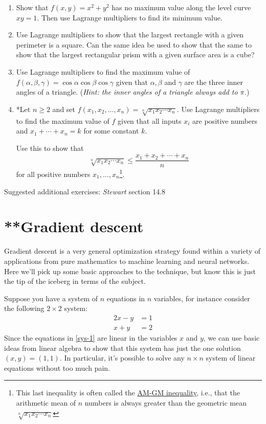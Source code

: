 \documentclass[12pt]{article}
\numberwithin{equation}{subsection}
\numberwithin{figure}{subsection}
\theoremstyle{note}
\begin{document}
{\begin{enumerate}[label=\arabic*.]
\item Show that $f(x,y)=x^2+y^2$ has no maximum value along the level curve $xy=1$. Then use Lagrange multipliers to find its minimum value.

\item Use Lagrange multipliers to show that the largest rectangle with a given perimeter is a square. Can the same idea be used to show that the same to show that the largest rectangular prism with a given surface area is a cube?

\item Use Lagrange multipliers to find the maximum value of $f(\alpha, \beta,\gamma)=\cos \alpha \cos\beta \cos\gamma$ given that $\alpha, \beta$ and $\gamma$ are the three inner angles of a triangle. (\textit{Hint: the inner angles of a triangle always add to $\pi$.})

\item *Let $n\geq 2$ and set $f(x_1,x_2,\dots, x_n)=\sqrt[n]{x_1x_2\cdots x_n}$. Use Lagrange multipliers to find the maximum value of $f$ given that all inputs $x_i$ are positive numbers and $x_1+\cdots+x_n=k$ for some constant $k$. 

Use this to show that \[ \sqrt[n]{x_1x_2\cdots x_n} \leq \dfrac{x_1+x_2+\cdots+x_n}{n} \] for all positive numbers $x_1,\dots, x_n$\footnote{This last inequality is often called the \href{https://en.wikipedia.org/wiki/AM\%E2\%80\%93GM_inequality}{AM-GM inequality}, i.e., that the arithmetic mean of $n$ numbers is always greater than the geometric mean $\sqrt[n]{x_1x_2\cdots x_n}$}.

\end{enumerate}
Suggested additional exercises: \textit{Stewart} section 14.8


\section{**Gradient descent}

Gradient descent is a very general optimization strategy found within a variety of applications from pure mathematics to machine learning and neural networks. Here we'll pick up some basic approaches to the technique, but know this is just the tip of the iceberg in terms of the subject.

Suppose you have a system of $n$ equations in $n$ variables, for instance consider the following $2\times 2$ system:
\begin{align} 2x-y & =1 \nonumber \\
x+y &=2 \label{sys-1} \end{align}
Since the equations in \eqref{sys-1} are linear in the variables $x$ and $y$, we can use basic ideas from linear algebra to show that this system has just the one solution $(x,y)=(1,1)$. In particular, it's possible to solve any $n\times n$ system of linear equations without too much pain.

}
\end{document}
